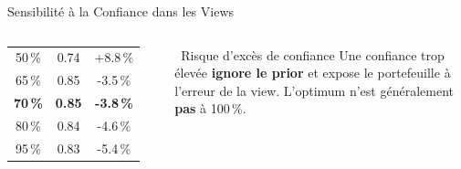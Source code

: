 \documentclass[aspectratio=169, 10pt, t]{beamer}
\begin{document}
\begin{frame}{Sensibilité à la Confiance dans les Views}
\begin{columns}[c]
\begin{tabular}{@{}ccc@{}}
        50\,\% & 0.74 & +8.8\,\% \\
        65\,\% & 0.85 & -3.5\,\% \\
        \textbf{70\,\%} & \textbf{0.85} & \textbf{-3.8\,\%} \\
        80\,\% & 0.84 & -4.6\,\% \\
        95\,\% & 0.83 & -5.4\,\% \\
        \bottomrule
      \end{tabular}
      \vspace{0.5em}
      \begin{alertblock}{\small\faExclamationTriangle\ Risque d'excès de confiance}
        \small
        Une confiance trop élevée \textbf{ignore le prior} et expose
        le portefeuille à l'erreur de la view.
        L'optimum n'est généralement \textbf{pas} à 100\,\%.
      \end{alertblock}
  \end{columns}
\end{frame}
\end{document}
